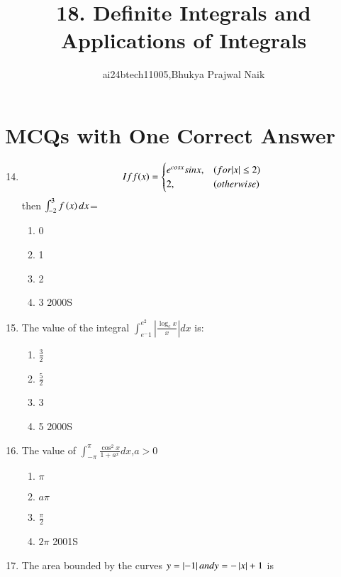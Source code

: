 \documentclass[journal,12pt,twocolumn]{IEEEtran}
\theoremstyle{remark}
\begin{document}

\vspace{3cm}

\title{18. Definite Integrals and Applications of Integrals}
\author{ai24btech11005,Bhukya Prajwal Naik}
\maketitle
\section{MCQs with One Correct Answer}

\begin{enumerate}
\setcounter{enumi}{13}   
\item
\begin{equation}
If f(x) = 
\begin{cases}
    e^{cosx}sinx,& \text(for |x|\leq2)\\
    2,& \text(otherwise)\\
\end{cases}\end{equation}
then $\int_{-2}^{3}f\left(x\right) dx$=
\begin{enumerate}
    \item 0
    \item 1
    \item 2
    \item 3
    \hfill{{2000S}}
\end{enumerate}
\item The value of the integral $\int_{e^-1}^{e^2}\left|\frac{\log_e x}{x}\right| dx$ is:
\begin{enumerate}
	\item $\frac{3}{2}$
	\item $\frac{5}{2}$
    \item  3
    \item  5
    \hfill{{2000S}}
\end{enumerate}
\item The value of $\int_{-\pi}^{\pi}\frac{\cos^2 x}{1+a^ x } dx$,$a>0$
\begin{enumerate}
    \item$\pi$
    \item $a\pi$
    \item $\frac{\pi}{2}$
    \item $2\pi$
    \hfill{{2001S}}
\end{enumerate}
\item The area bounded by the curves $y=\left\vert-1\right\vert and y=-\left\vert x\right\vert+1$ is

\end{enumerate}
\end{document}
